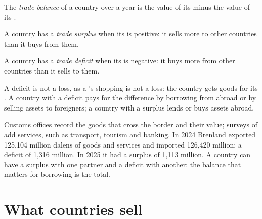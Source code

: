 \begin{definition}\label{def:g9:international-trade:trade-balance}
The \emph{trade balance} of a country over a year is the value of its  minus
the value of its .
\end{definition}

\begin{definition}\label{def:g9:international-trade:trade-surplus}
A country has a \emph{trade surplus} when its  is positive: it sells
more to other countries than it buys from them.
\end{definition}

\begin{definition}\label{def:g9:international-trade:trade-deficit}
A country has a \emph{trade deficit} when its  is negative: it buys more
from other countries than it sells to them.
\end{definition}

A deficit is not a loss, as a 's shopping is not a loss: the country gets goods for its . A
country with a deficit pays for the difference by borrowing from abroad or by selling assets to foreigners;
a country with a surplus lends or buys assets abroad.

\begin{measure}[The trade balance]
Customs offices record the goods that cross the border and their value; surveys of  add services,
such as transport, tourism and banking. In 2024 Brenland exported 125,104 million dalens of goods and
services and imported 126,420 million: a deficit of 1,316 million. In 2025 it had a surplus of 1,113
million. A country can have a surplus with one partner and a deficit with another: the balance that matters
for borrowing is the total.
\end{measure}

\section{What countries sell}

